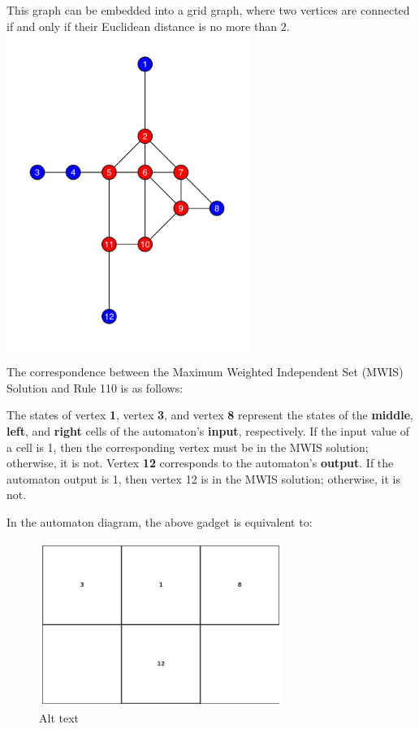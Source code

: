 \documentclass[twocolumn,superscriptaddress,english,showpacs,longbibliography]{revtex4-2}
\begin{document}
This graph can be embedded into a grid graph, where two vertices are
connected if and only if their Euclidean distance is no more than $2$.
\includegraphics[width=3.125in,height=\textheight,keepaspectratio]{../notes/images/image-1.png}

The correspondence between the Maximum Weighted Independent Set (MWIS)
Solution and Rule 110 is as follows:

The states of vertex \textbf{1}, vertex \textbf{3}, and vertex
\textbf{8} represent the states of the \textbf{middle}, \textbf{left},
and \textbf{right} cells of the automaton's \textbf{input},
respectively. If the input value of a cell is 1, then the corresponding
vertex must be in the MWIS solution; otherwise, it is not. Vertex
\textbf{12} corresponds to the automaton's \textbf{output}. If the
automaton output is 1, then vertex 12 is in the MWIS solution;
otherwise, it is not.

In the automaton diagram, the above gadget is equivalent to:

\begin{figure}
\centering
\includegraphics[width=3.125in,height=\textheight,keepaspectratio]{../notes/images/rule110.png}
\caption{Alt text}
\end{figure}
\end{document}
